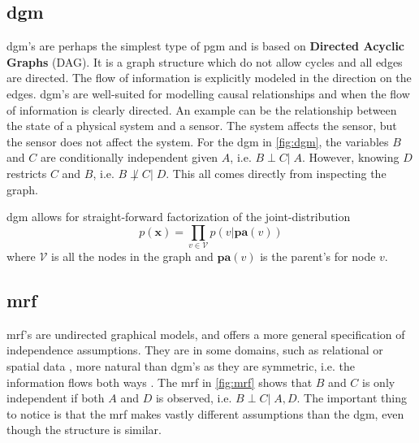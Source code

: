 \subsection{\acrfull{dgm}}
\acrshort{dgm}'s are perhaps the simplest type of \acrshort{pgm} and is based on \textbf{Directed Acyclic Graphs} (DAG). It is a graph structure which do not allow cycles and all edges are directed. The flow of information is explicitly modeled in the direction on the edges. \acrshort{dgm}'s are well-suited for modelling causal relationships and when the flow of information is clearly directed. An example can be the relationship between the state of a physical system and a sensor. The system affects the sensor, but the sensor does not affect the system. For the \acrshort{dgm} in \cref{fig:dgm}, the variables $B$ and $C$ are conditionally independent given $A$, i.e. $B \perp C | \; A$. However, knowing $D$ restricts $C$ and $B$, i.e. $B \not\perp C | \; D$. This all comes directly from inspecting the graph. 

\acrshort{dgm} allows for straight-forward factorization of the joint-distribution 
\begin{equation}\label{eq:dgm_factorization}
    p(\mathbf{x}) = \prod_{v \in \mathcal{V}}p(v | \mathbf{pa}(v))
\end{equation}
where $\mathcal{V}$ is all the nodes in the graph and $\mathbf{pa}(v)$ is the parent's for node $v$. 

\subsection{\acrfull{mrf}} \label{sec:mrf}

\acrshort{mrf}'s are undirected graphical models, and offers a more general specification of independence assumptions. They are in some domains, such as relational or spatial data , more natural than \acrshort{dgm}'s as they are symmetric, i.e. the information flows both ways \cite{murphy}. The \acrshort{mrf} in \cref{fig:mrf} shows that $B$ and $C$ is only independent if both $A$ and $D$ is observed, i.e. $B \perp C | \; A, D$. The important thing to notice is that the \acrshort{mrf} makes vastly different assumptions than the \acrshort{dgm}, even though the structure is similar.

